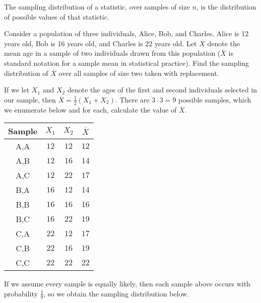 \begin{defn}
The sampling distribution of a statistic, over samples of size $n$, is the distribution of possible values of that statistic.
\end{defn}

\begin{examp}\label{MeanAgeEx} Consider a population of three individuals, Alice, Bob, and Charles. Alice is 12 years old, Bob is 16 years old, and Charles is 22 years old. Let $\overline{X}$ denote the mean age in a sample of two individuals drawn from this population ($\overline{X}$ is standard notation for a sample mean in statistical practice). Find the sampling distribution of $\overline{X}$ over all samples of size two taken with replacement.
\par
\noindent If we let $X_1$ and $X_2$ denote the ages of the first and second individuals selected in our sample, then $\overline{X} = \frac{1}{2}(X_1 + X_2)$. There are $3\cdot3 = 9$ possible samples, which we enumerate below and for each, calculate the value of $\overline{X}$.

\begin{center}
\begin{tabular}{c|c|c|c}
Sample & $X_1$ & $X_2$ & $\overline{X}$ \\
\hline
A,A & $12$ & $12$ & $12$ \\
A,B & $12$ & $16$ & $14$ \\
A,C & $12$ & $22$ & $17$ \\
B,A & $16$ & $12$ & $14$ \\
B,B & $16$ & $16$ & $16$ \\
B,C & $16$ & $22$ & $19$ \\
C,A & $22$ & $12$ & $17$ \\
C,B & $22$ & $16$ & $19$ \\
C,C & $22$ & $22$ & $22$ \\
\end{tabular}
\end{center}

\par
\noindent If we assume every sample is equally likely, then each sample above occurs with probability $\frac{1}{9}$, so we obtain the sampling distribution below.


\end{examp}

